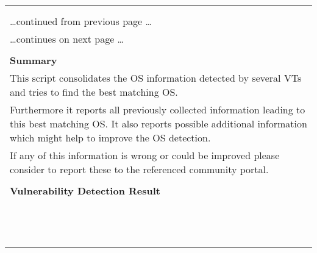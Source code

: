 \documentclass{article}
\begin{document}
\begin{longtable}{|p{}|}
\hline
\rowcolor{gvm_log}{\color{white}{Log (CVSS: 0.0) }}\\
\rowcolor{gvm_log}{\color{white}{NVT: OS Detection Consolidation and Reporting}}\\
\hline
\endfirsthead
\hfill\ldots continued from previous page \ldots \\
\hline
\endhead
\hline
\ldots continues on next page \ldots \\
\endfoot
\hline
\endlastfoot
\\
\textbf{Summary}\\
This script consolidates the OS information detected by several
  VTs and tries to find the best matching OS.\\
  Furthermore it reports all previously collected information leading to this best matching OS. It
  also reports possible additional information which might help to improve the OS detection.\\
  If any of this information is wrong or could be improved please consider to report these to the
  referenced community portal.\\

        \hline
        \\
\textbf{Vulnerability Detection Result}\\
\rowcolor{white}{\verb=Best matching OS:=}\\
\rowcolor{white}{\verb=OS:           Linux Kernel=}\\
\rowcolor{white}{\verb=CPE:          cpe:/o:linux:kernel=}\\
\rowcolor{white}{\verb=Found by NVT: 1.3.6.1.4.1.25623.1.0.102002 (Operating System (OS) Detection (ICM=}\\
\rowcolor{white}{$\hookrightarrow$\verb=P))=}\\
\rowcolor{white}{\verb=Concluded from ICMP based OS fingerprint=}\\
\rowcolor{white}{\verb=Setting key "Host/runs_unixoide" based on this information=}\\
\rowcolor{white}{\verb=Other OS detections (in order of reliability):=}\\
\rowcolor{white}{\verb=OS:           FreeBSD=}\\
\rowcolor{white}{\verb=CPE:          cpe:/o:freebsd:freebsd=}\\
\rowcolor{white}{\verb=Found by NVT: 1.3.6.1.4.1.25623.1.0.102002 (Operating System (OS) Detection (ICM=}\\
\rowcolor{white}{$\hookrightarrow$\verb=P))=}\\
\rowcolor{white}{\verb=Concluded from ICMP based OS fingerprint=}\\


\end{longtable}
\end{document}
